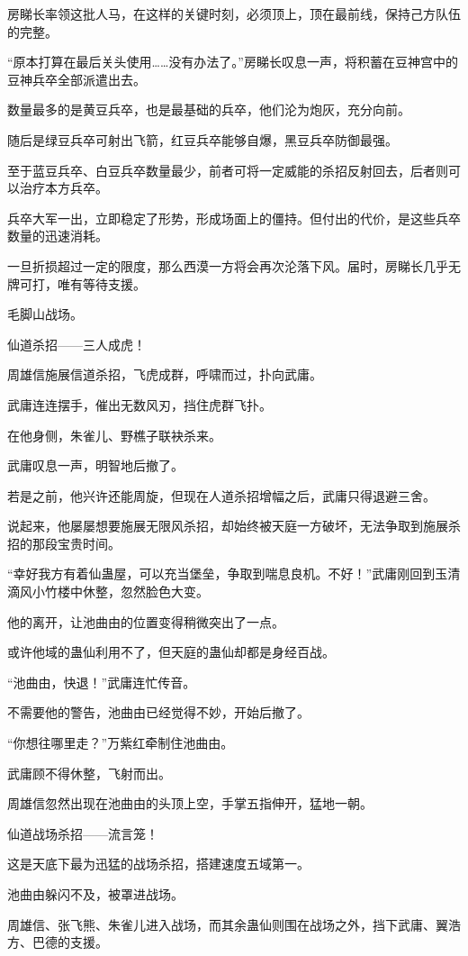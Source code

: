 \begin{this_body}
房睇长率领这批人马，在这样的关键时刻，必须顶上，顶在最前线，保持己方队伍的完整。

“原本打算在最后关头使用……没有办法了。”房睇长叹息一声，将积蓄在豆神宫中的豆神兵卒全部派遣出去。

数量最多的是黄豆兵卒，也是最基础的兵卒，他们沦为炮灰，充分向前。

随后是绿豆兵卒可射出飞箭，红豆兵卒能够自爆，黑豆兵卒防御最强。

至于蓝豆兵卒、白豆兵卒数量最少，前者可将一定威能的杀招反射回去，后者则可以治疗本方兵卒。

兵卒大军一出，立即稳定了形势，形成场面上的僵持。但付出的代价，是这些兵卒数量的迅速消耗。

一旦折损超过一定的限度，那么西漠一方将会再次沦落下风。届时，房睇长几乎无牌可打，唯有等待支援。

毛脚山战场。

仙道杀招——三人成虎！

周雄信施展信道杀招，飞虎成群，呼啸而过，扑向武庸。

武庸连连摆手，催出无数风刃，挡住虎群飞扑。

在他身侧，朱雀儿、野樵子联袂杀来。

武庸叹息一声，明智地后撤了。

若是之前，他兴许还能周旋，但现在人道杀招增幅之后，武庸只得退避三舍。

说起来，他屡屡想要施展无限风杀招，却始终被天庭一方破坏，无法争取到施展杀招的那段宝贵时间。

“幸好我方有着仙蛊屋，可以充当堡垒，争取到喘息良机。不好！”武庸刚回到玉清滴风小竹楼中休整，忽然脸色大变。

他的离开，让池曲由的位置变得稍微突出了一点。

或许他域的蛊仙利用不了，但天庭的蛊仙却都是身经百战。

“池曲由，快退！”武庸连忙传音。

不需要他的警告，池曲由已经觉得不妙，开始后撤了。

“你想往哪里走？”万紫红牵制住池曲由。

武庸顾不得休整，飞射而出。

周雄信忽然出现在池曲由的头顶上空，手掌五指伸开，猛地一朝。

仙道战场杀招——流言笼！

这是天底下最为迅猛的战场杀招，搭建速度五域第一。

池曲由躲闪不及，被罩进战场。

周雄信、张飞熊、朱雀儿进入战场，而其余蛊仙则围在战场之外，挡下武庸、翼浩方、巴德的支援。


\end{this_body}
